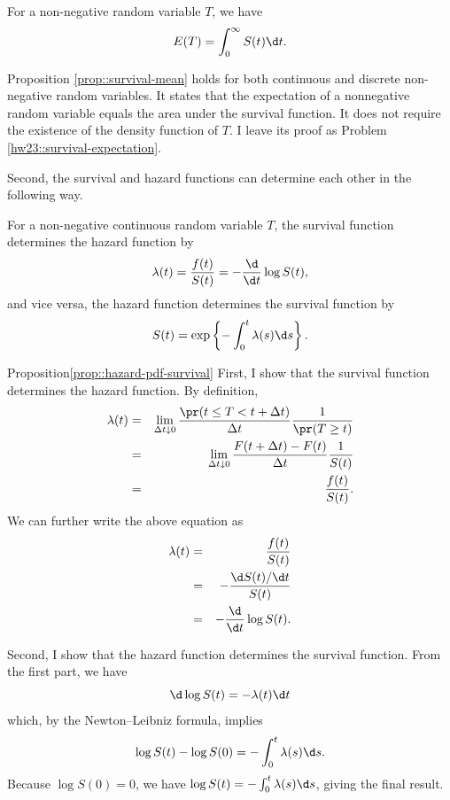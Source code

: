 \begin{proposition}\label{prop::survival-mean}
For a non-negative random variable $T$, we have 
$$
E(T) = \int_{0}^{\infty} S(t) \d t .
$$
\end{proposition}

Proposition \ref{prop::survival-mean} holds for both continuous and discrete non-negative random variables.
It states that the expectation of a nonnegative random variable equals the area under the survival function. It does not require the existence of the density function of $T$. I leave its proof as Problem \ref{hw23::survival-expectation}. 



Second, the survival and hazard functions can determine each other in the following way.

\begin{proposition}\label{prop::hazard-pdf-survival}
For a non-negative continuous random variable $T$,  the survival function determines the hazard function by
$$
\lambda(t)  =\frac{f(t)}{S(t)} = -\frac{\d}{\d t}\log S(t),
$$
and vice versa, the hazard function determines the survival function by
$$
S(t)  =\exp\left\{ -\int_{0}^{t}\lambda(s)\d s\right\} .
$$
\end{proposition}



\begin{myproof}{Proposition}{\ref{prop::hazard-pdf-survival}}
First, I show that the survival function determines the hazard function. 
By definition,
\begin{eqnarray*}
\lambda(t) &=&\lim_{\Delta t\downarrow0}\frac{\pr(t\leq T<t+\Delta t)}{\Delta t}\frac{1}{\pr(T\geq t)}  \\
&=&\lim_{\Delta t\downarrow0}\frac{F(t+\Delta t)-F(t)}{\Delta t}\frac{1}{S(t)}\\
&=&\frac{f(t)}{S(t)}.
\end{eqnarray*}
We can further write the above equation as
\begin{eqnarray*}
\lambda(t)  &=& \frac{f(t)}{S(t)} \\
&=& -\frac{\d S(t)/\d t}{S(t)} \\
&=&  -\frac{\d}{\d t}\log S(t).
\end{eqnarray*}

Second, I show that the hazard function determines the survival function.  From the first part, we have 
\[
\d\log S(t)=-\lambda(t)\d t
\]
which, by the Newton--Leibniz formula, implies
\[
\log S(t) - \log S(0)=-\int_{0}^{t}\lambda(s)\d s . 
\]
Because $\log S(0)=0$, we have $\log S(t) = -\int_{0}^{t}\lambda(s)\d s$, giving the final result. 
\end{myproof}





